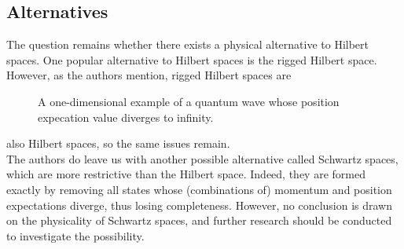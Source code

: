 \documentclass[12pt]{article}
\begin{document}
\begin{multicols}{2}
    \section*{Alternatives}
    The question remains whether there exists a physical alternative to Hilbert spaces. One popular alternative to Hilbert spaces is the rigged Hilbert space\cite{de_la_madrid_role_2005}. However, as the authors mention, rigged Hilbert spaces are
    \begin{figure}[H]
        \centering
        \resizebox{\columnwidth}{!}{
        
        }
        \caption{A one-dimensional example of a quantum wave whose position expecation value diverges to infinity.}
        \label{fig:sketch}
    \end{figure}\noindent
    also Hilbert spaces, so the same issues remain.\\
    The authors do leave us with another possible alternative called Schwartz spaces\cite{becnel_schwartz_2015}, which are more restrictive than the Hilbert space. Indeed, they are formed exactly by removing all states whose (combinations of) momentum and position expectations diverge, thus losing completeness. However, no conclusion is drawn on the physicality of Schwartz spaces, and further research should be conducted to investigate the possibility.
\end{multicols}
\printbibliography
\end{document}
